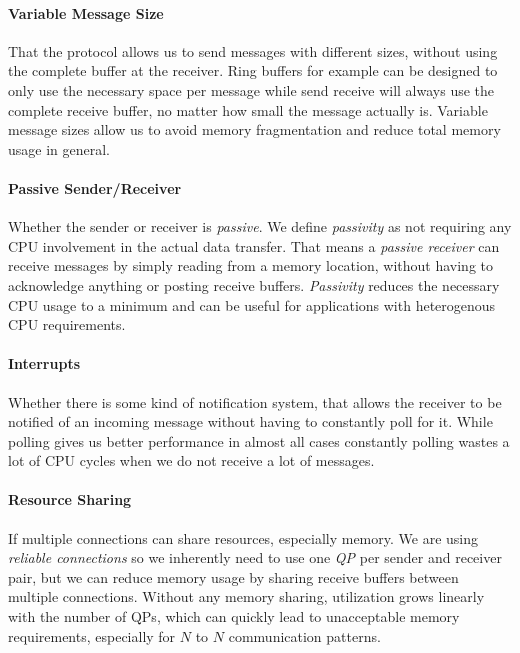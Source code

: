 \paragraph{Variable Message Size} That the protocol allows us to send messages with different sizes, without using the 
complete buffer at the receiver. Ring buffers for example can be designed to only use the necessary space per message
while send receive will always use the complete receive buffer, no matter how small the message actually is. Variable
message sizes allow us to avoid memory fragmentation and reduce total memory usage in general.

\paragraph{Passive Sender/Receiver} Whether the sender or receiver is \emph{passive}. We define \emph{passivity} as not 
requiring any CPU involvement in the actual data transfer. That means a \emph{passive receiver} can receive messages by
simply reading from a memory location, without having to acknowledge anything or posting receive buffers. \emph{Passivity} 
reduces the necessary CPU usage to a minimum and can be useful for applications with heterogenous CPU requirements.

\paragraph{Interrupts} Whether there is some kind of notification system, that allows the receiver to be notified 
of an incoming message without having to constantly poll for it. While polling gives us better performance in almost all cases
constantly polling wastes a lot of CPU cycles when we do not receive a lot of messages.

\paragraph{Resource Sharing} If multiple connections can share resources, especially memory. We are using \emph{reliable connections}
so we inherently need to use one \emph{QP} per sender and receiver pair, but we can reduce memory usage by sharing receive 
buffers between multiple connections. Without any memory sharing, utilization grows linearly with the number of QPs, which 
can quickly lead to unacceptable memory requirements, especially for $N$ to $N$ communication patterns.

